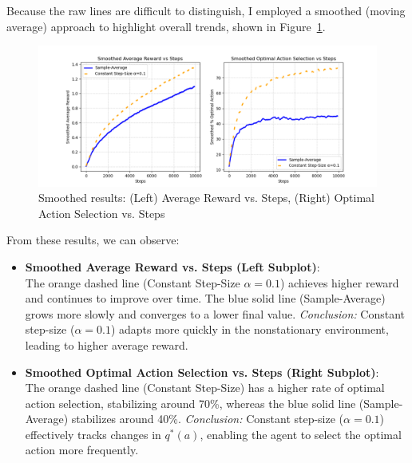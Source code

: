 \documentclass{article}
\begin{document}
Because the raw lines are difficult to distinguish, I employed a smoothed (moving average) approach to highlight overall trends, shown in Figure~\ref{fig:3.2}.


\begin{figure}[h!]
\centering
\includegraphics[width=\linewidth]{figure3.png}
\caption{Smoothed results: (Left) Average Reward vs. Steps, (Right) Optimal Action Selection vs. Steps}
\label{fig:3.2}
\end{figure}











From these results, we can observe:

\begin{itemize}
    \item \textbf{Smoothed Average Reward vs. Steps (Left Subplot)}:\\
    The orange dashed line (Constant Step-Size \(\alpha=0.1\)) achieves higher reward and continues to improve over time.
    The blue solid line (Sample-Average) grows more slowly and converges to a lower final value.
    \newline
    \emph{Conclusion:} Constant step-size (\(\alpha=0.1\)) adapts more quickly in the nonstationary environment, leading to higher average reward.

    \item \textbf{Smoothed Optimal Action Selection vs. Steps (Right Subplot)}:\\
    The orange dashed line (Constant Step-Size) has a higher rate of optimal action selection, stabilizing around 70\%,
    whereas the blue solid line (Sample-Average) stabilizes around 40\%.
    \newline
    \emph{Conclusion:} Constant step-size (\(\alpha=0.1\)) effectively tracks changes in \(q^*(a)\), enabling the agent to select the optimal action more frequently.
\end{itemize}
\end{document}
